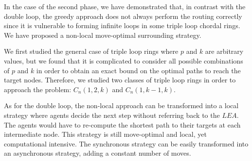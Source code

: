 In the case of the second phase, we have demonstrated that, in contrast with the double loop, the greedy approach does not always perform the routing correctly since it is vulnerable to forming infinite loops in some triple loop chordal rings. 
We have  proposed a  non-local move-optimal surrounding strategy. 


We  first  studied the general case of triple loop rings where $p$ and $k$ are arbitrary values, but we found that it is complicated to consider all possible combinations of $p$ and $k$ in order to obtain an exact bound on the optimal paths to reach the target nodes.
Therefore, we studied  two  classes of triple loop rings in order to approach the problem: $C_n(1,2,k)$ and $C_n(1,k-1,k)$.

As for the double loop, the   non-local approach can be transformed into a local strategy where agents decide the next step without referring back to the $LEA$. The agents would have to re-compute the shortest path to their targets at each intermediate node. This strategy is still move-optimal and local, yet computational intensive.  The synchronous strategy can be easily transformed into an asynchronous strategy, adding a constant number of moves. 




